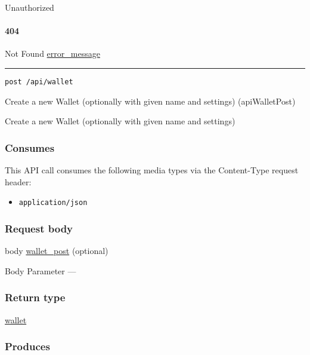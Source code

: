 Unauthorized \protect\hyperlink{}{}

\hypertarget{section-42}{%
\paragraph{404}\label{section-42}}

Not Found \protect\hyperlink{error_message}{error\_message}

\begin{center}\rule{0.5\linewidth}{\linethickness}\end{center}

\protect\hypertarget{apiWalletPost}{}{}

\begin{verbatim}
post /api/wallet
\end{verbatim}

Create a new Wallet (optionally with given name and settings)
({apiWalletPost})

Create a new Wallet (optionally with given name and settings)

\hypertarget{consumes-5}{%
\subsubsection{Consumes}\label{consumes-5}}

This API call consumes the following media types via the {Content-Type}
request header:

\begin{itemize}
\tightlist
\item
  \texttt{application/json}
\end{itemize}

\hypertarget{request-body-5}{%
\subsubsection{Request body}\label{request-body-5}}

body \protect\hyperlink{wallet_post}{wallet\_post} (optional)

{Body Parameter} ---

\hypertarget{return-type-10}{%
\subsubsection{Return type}\label{return-type-10}}

\protect\hyperlink{wallet}{wallet}

\hypertarget{produces-13}{%
\subsubsection{Produces}\label{produces-13}}

